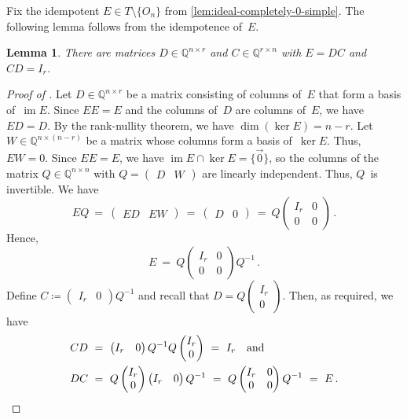 \documentclass{lmcs}
\newtheorem{lemma}[thm]{Lemma}
\theoremstyle{definition}
\DeclareMathOperator{\im}{im}
\newcommand{\Q}{\mathbb{Q}}
\begin{document}
Fix the idempotent $E \in T \setminus \{O_n\}$ from \cref{lem:ideal-completely-0-simple}.
The following lemma follows from the idempotence of~$E$.

\begin{lemma} \label{lem:CD}
There are matrices $D \in \Q^{n \times r}$ and $C \in \Q^{r \times n}$ with $E = D C$ and $C D = I_r$.
\end{lemma}
\begin{proof}[Proof of ]
Let $D \in \Q^{n \times r}$ be a matrix consisting of columns of~$E$ that form a basis of~$\im E$.
Since $E E = E$ and the columns of~$D$ are columns of~$E$, we have $E D = D$.
By the rank-nullity theorem, we have $\dim (\ker E) = n - r$.
Let $W \in \Q^{n \times (n-r)}$ be a matrix whose columns form a basis of~$\ker E$.
Thus, $E W = 0$.
Since $E E = E$, we have $\im E \cap \ker E = \{\vec{0}\}$, so the columns of the matrix $Q \in \Q^{n \times n}$ with $Q = \begin{pmatrix} D & W \end{pmatrix}$ are linearly independent.
Thus, $Q$~is invertible.
We have
\[
E Q \ = \ \begin{pmatrix} E D & E W \end{pmatrix} \ = \ \begin{pmatrix} D & 0 \end{pmatrix} \ = \ Q \begin{pmatrix} I_r & 0 \\ 0 & 0 \end{pmatrix}\,.
\]
Hence,
\[
E \ = \ Q \begin{pmatrix} I_r & 0 \\ 0 & 0 \end{pmatrix} Q^{-1}\,.
\]
Define $C \coloneqq \begin{pmatrix} I_r & 0 \end{pmatrix} Q^{-1}$ and recall that $D = Q \begin{pmatrix} I_r \\ 0 \end{pmatrix}$.
Then, as required, we have
\begin{align*}
C D \ &= \ \begin{pmatrix} I_r & 0 \end{pmatrix} Q^{-1} Q \begin{pmatrix} I_r \\ 0 \end{pmatrix} \ = \ I_r \quad \text{and} \\
D C \ &= \  Q \begin{pmatrix} I_r \\ 0 \end{pmatrix} \begin{pmatrix} I_r & 0 \end{pmatrix} Q^{-1} \ = \ Q \begin{pmatrix} I_r & 0 \\ 0 & 0 \end{pmatrix} Q^{-1} \ = \ E\,.\qedhere
\end{align*}
\end{proof}
\end{document}
